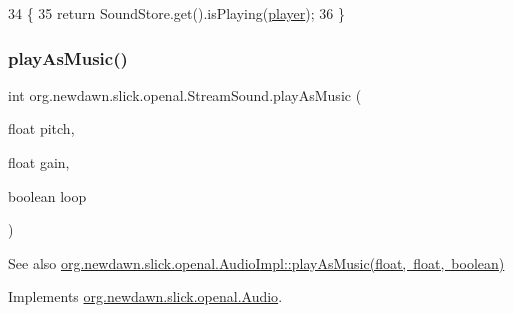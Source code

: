 \begin{DoxyCode}
34                                \{
35         \textcolor{keywordflow}{return} SoundStore.get().isPlaying(\mbox{\hyperlink{classorg_1_1newdawn_1_1slick_1_1openal_1_1_stream_sound_a5e4d0d6e22af804ce94996f6ab90872f}{player}});
36     \}
\end{DoxyCode}
\mbox{\label{classorg_1_1newdawn_1_1slick_1_1openal_1_1_stream_sound_ac7efc7d8db3fe1f34edae365c7d226fe}} 
\subsubsection{\texorpdfstring{play\+As\+Music()}{playAsMusic()}}
{\footnotesize\ttfamily int org.\+newdawn.\+slick.\+openal.\+Stream\+Sound.\+play\+As\+Music (\begin{DoxyParamCaption}\item[{float}]{pitch,  }\item[{float}]{gain,  }\item[{boolean}]{loop }\end{DoxyParamCaption})\hspace{0.3cm}{\ttfamily [inline]}}

\begin{DoxySeeAlso}{See also}
\mbox{\hyperlink{classorg_1_1newdawn_1_1slick_1_1openal_1_1_audio_impl_ac8b7973bc209b0a2ecfc169b1d9eaae4}{org.\+newdawn.\+slick.\+openal.\+Audio\+Impl\+::play\+As\+Music(float, float, boolean)}} 
\end{DoxySeeAlso}


Implements \mbox{\hyperlink{interfaceorg_1_1newdawn_1_1slick_1_1openal_1_1_audio_a9a13784b5ec9ce06c8756f98b00e05ab}{org.\+newdawn.\+slick.\+openal.\+Audio}}.


